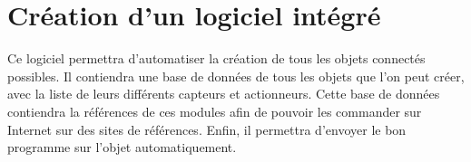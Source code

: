 \section*{Création d'un logiciel intégré}
	Ce logiciel permettra d'automatiser la création de tous les objets connectés possibles. Il 
	contiendra une base de données de tous les objets que l'on peut créer, avec la liste de leurs 
	différents 	capteurs et actionneurs. Cette base de données contiendra la références de ces 
	modules afin de pouvoir les 	commander sur Internet sur des sites de références. Enfin, il 
	permettra d'envoyer le bon programme sur l'objet automatiquement.

